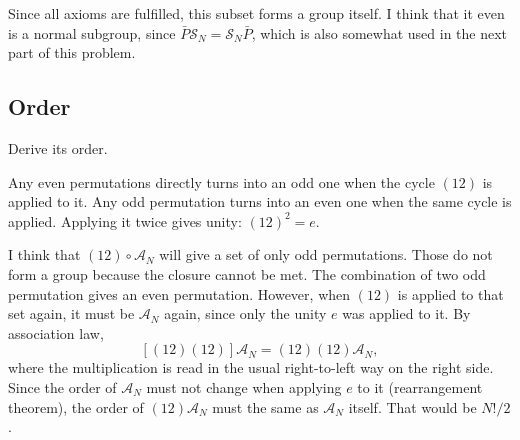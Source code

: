 \documentclass[11pt, ngerman, fleqn, DIV=15, headinclude, BCOR=1cm]{scrartcl}
\begin{document}
Since all axioms are fulfilled, this subset forms a group itself. I think that
it even is a normal subgroup, since $\bar P \mathcal S_N = \mathcal S_N \bar
P$, which is also somewhat used in the next part of this problem.

\subsection{Order}

\begin{problem}
    Derive its order.
\end{problem}

Any even permutations directly turns into an odd one when the cycle $(12)$ is
applied to it. Any odd permutation turns into an even one when the same cycle
is applied. Applying it twice gives unity: $(12)^2 = e$.

I think that $(12) \circ \mathcal A_N$ will give a set of only odd
permutations. Those do not form a group because the closure cannot be met. The
combination of two odd permutation gives an even permutation. However, when
$(12)$ is applied to that set again, it must be $\mathcal A_N$ again, since
only the unity $e$ was applied to it. By association law,
\[
    [(12) (12)] \mathcal A_N = (12) (12) \mathcal A_N,
\]
where the multiplication is read in the usual right-to-left way on the right
side. Since the order of $\mathcal A_N$ must not change when applying $e$ to it
(rearrangement theorem), the order of $(12) \mathcal A_N$ must the same as
$\mathcal A_N$ itself. That would be $N!/2$.
\end{document}

